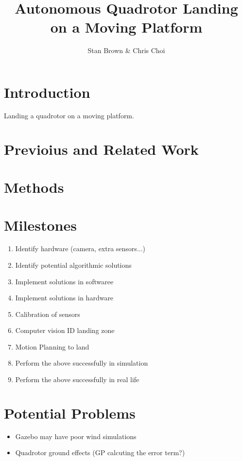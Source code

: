 \documentclass{article}
\begin{document}
\title{Autonomous Quadrotor Landing on a Moving Platform}
\author{Stan Brown \& Chris Choi}
\maketitle



\section*{Introduction}
Landing a quadrotor on a moving platform.



\section*{Previoius and Related Work}




\section*{Methods}





\section*{Milestones}
\begin{enumerate}
	\item{Identify hardware (camera, extra sensors...)}
	\item{Identify potential algorithmic solutions}
	\item{Implement solutions in softwaree}
	\item{Implement solutions in hardware}
	\item{Calibration of sensors}
	\item{Computer vision ID landing zone}
	\item{Motion Planning to land}
	\item{Perform the above successfully in simulation}
	\item{Perform the above successfully in real life}
\end{enumerate}


\section*{Potential Problems}
\begin{itemize}
	\item{Gazebo may have poor wind simulations}
	\item{Quadrotor ground effects (GP calcuting the error term?)}
\end{itemize}




{}

\end{document}
